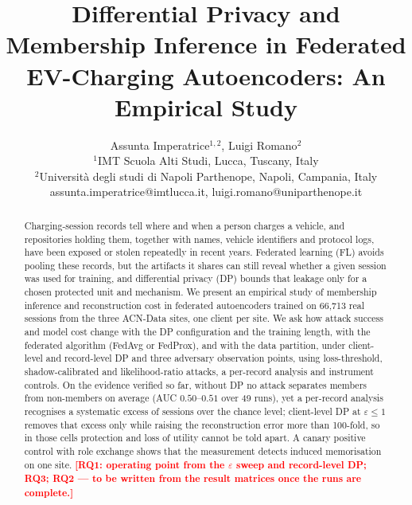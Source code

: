 \documentclass[conference]{IEEEtran}
\title{Differential Privacy and Membership Inference in Federated EV-Charging Autoencoders: An Empirical Study}
\newcommand{\pending}[1]{\textcolor{red}{\textbf{[#1]}}}
\begin{document}
 

\author{Assunta Imperatrice$^{1,2}$, Luigi Romano$^{2}$\\
	\normalsize $^{1}$IMT Scuola Alti Studi, Lucca, Tuscany, Italy\\
	\normalsize $^{2}$Università degli studi di Napoli Parthenope, Napoli, Campania, Italy\\
	\normalsize assunta.imperatrice@imtlucca.it, luigi.romano@uniparthenope.it\\
	
}

\maketitle

\begin{abstract}
Charging-session records tell where and when a person charges a vehicle, and
repositories holding them, together with names, vehicle identifiers and
protocol logs, have been exposed or stolen repeatedly in recent years.
Federated learning (FL) avoids pooling these records, but the artifacts it
shares can still reveal whether a given session was used for training, and
differential privacy (DP) bounds that leakage only for a chosen protected
unit and mechanism. We present an empirical study of membership inference and
reconstruction cost in federated autoencoders trained on 66{,}713 real
sessions from the three ACN-Data sites, one client per site. We ask how attack
success and model cost change with the DP configuration and the training
length, with the federated algorithm (FedAvg or FedProx), and with the data
partition, under client-level and record-level DP and three adversary
observation points, using loss-threshold, shadow-calibrated and
likelihood-ratio attacks, a per-record analysis and instrument controls. On
the evidence verified so far, without DP no attack separates members from
non-members on average (AUC $0.50$--$0.51$ over 49 runs), yet a per-record
analysis recognises a systematic excess of sessions over the chance level;
client-level DP at $\varepsilon \le 1$ removes that excess only while raising
the reconstruction error more than 100-fold, so in those cells protection and
loss of utility cannot be told apart. A canary positive control with role
exchange shows that the measurement detects induced memorisation on one site.
\pending{RQ1: operating point from the $\varepsilon$ sweep and record-level
DP; RQ3; RQ2 --- to be written from the result matrices once the runs are
complete.}
\end{abstract}
\end{document}

